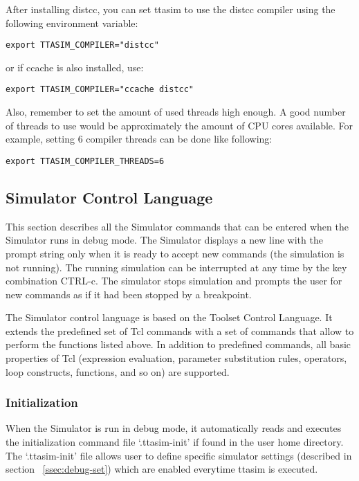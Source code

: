 \documentclass[twoside]{tceusermanual}
\begin{document}
After installing distcc, you can set ttasim to use the distcc compiler using the
following environment variable:
\begin{verbatim}
export TTASIM_COMPILER="distcc"
\end{verbatim} or if ccache is also installed, use:
\begin{verbatim}
export TTASIM_COMPILER="ccache distcc"\end{verbatim}

Also, remember to set the amount of used threads high enough. A good number
of threads to use would be approximately the amount of CPU cores
available. For example, setting 6 compiler threads can be done like following:
\begin{verbatim}
export TTASIM_COMPILER_THREADS=6
\end{verbatim}


\subsection{Simulator Control Language}

This section describes all the Simulator commands that can be entered when
the Simulator runs in debug mode.  The Simulator displays a new line with
the prompt string only when it is ready to accept new commands (the simulation
is not running).  The running simulation can be interrupted at any time by
the key combination CTRL-c.  The simulator stops simulation and prompts the
user for new commands as if it had been stopped by a breakpoint.

The Simulator control language is based on the Toolset Control
Language.  It extends the predefined set of Tcl commands
with a set of commands that allow to perform the functions listed above.  In
addition to predefined commands, all basic properties of Tcl (expression
evaluation, parameter substitution rules, operators, loop constructs,
functions, and so on) are supported.

\subsubsection{Initialization}

When the Simulator is run in debug mode, it automatically reads and executes
the initialization command file `.ttasim-init' if found in the user home
directory. The `.ttasim-init' file allows user to define specific simulator
settings (described in section ~\ref{ssec:debug-set}) which are enabled
everytime ttasim is executed.
\end{document}
